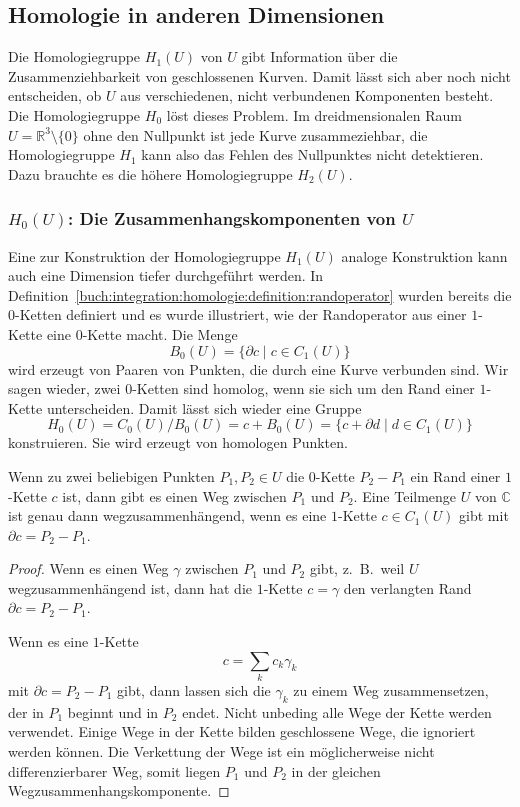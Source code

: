 %
%
%
\subsection{Homologie in anderen Dimensionen}
Die Homologiegruppe $H_1(U)$ von $U$ gibt Information über die 
Zusammenziehbarkeit von geschlossenen Kurven.
Damit lässt sich aber noch nicht entscheiden, ob $U$ aus verschiedenen,
nicht verbundenen Komponenten besteht.
Die Homologiegruppe $H_0$ löst dieses Problem.
Im dreidmensionalen Raum $U=\mathbb{R}^3\setminus\{0\}$ ohne den
Nullpunkt ist jede Kurve zusammeziehbar, die Homologiegruppe $H_1$
kann also das Fehlen des Nullpunktes nicht detektieren.
Dazu brauchte es die höhere Homologiegruppe $H_2(U)$.

%
%
\subsubsection{$H_0(U)$: Die Zusammenhangskomponenten von $U$}
Eine zur Konstruktion der Homologiegruppe $H_1(U)$ analoge Konstruktion
kann auch eine Dimension tiefer durchgeführt werden.
In Definition~\ref{buch:integration:homologie:definition:randoperator}
wurden bereits die $0$-Ketten definiert und es wurde illustriert,
wie der Randoperator aus einer $1$-Kette eine $0$-Kette macht.
Die Menge
\[
B_0(U)
=
\{
\partial c
\mid
c\in C_1(U)
\}
\]
wird erzeugt von Paaren von Punkten, die durch eine Kurve 
verbunden sind.
Wir sagen wieder, zwei $0$-Ketten sind homolog, wenn sie sich
um den Rand einer $1$-Kette unterscheiden.
Damit lässt sich wieder eine Gruppe
\[
H_0(U)
=
C_0(U) / B_0(U)
=
c + B_0(U)
=
\{
c + \partial d
\mid
d\in C_1(U)
\}
\]
konstruieren.
Sie wird erzeugt von homologen Punkten.

\begin{satz}[Wegzusammenhang]
Wenn zu zwei beliebigen Punkten $P_1,P_2\in U$ die $0$-Kette
$P_2-P_1$ ein Rand einer $1$-Kette $c$ ist, dann gibt es einen Weg
zwischen $P_1$ und $P_2$.
Eine Teilmenge $U$ von $\mathbb{C}$ ist genau dann wegzusammenhängend,
%
wenn es eine $1$-Kette $c \in C_1(U)$ gibt mit
$\partial c=P_2-P_1$.
\end{satz}

\begin{proof}
Wenn es einen Weg $\gamma$ zwischen $P_1$ und $P_2$ gibt, z.~B.~weil $U$
wegzusammenhängend ist, dann hat die
$1$-Kette $c=\gamma$ den verlangten Rand $\partial c = P_2-P_1$.

Wenn es eine $1$-Kette
\[
c
=
\sum_k
c_k\gamma_k
\]
mit $\partial c = P_2-P_1$ gibt, dann lassen sich die $\gamma_k$ zu einem
Weg zusammensetzen, der in $P_1$ beginnt und in $P_2$ endet.
Nicht unbeding alle Wege der Kette werden verwendet.
Einige Wege in der Kette bilden geschlossene Wege, die ignoriert
werden können.
Die Verkettung der Wege ist ein möglicherweise nicht differenzierbarer
Weg, somit liegen $P_1$ und $P_2$ in der gleichen Wegzusammenhangskomponente.
\end{proof}

